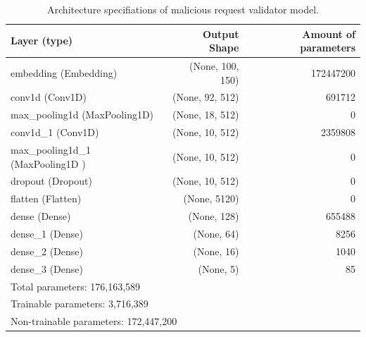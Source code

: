 \begin{table}[ht]
	\begin{tabular}{lrr}
	\hline
	\textbf{Layer (type)}             & \textbf{Output Shape} & \textbf{Amount of parameters} \\ \hline
	embedding (Embedding)             & (None, 100, 150)      & 172447200                     \\
	conv1d (Conv1D)                   & (None, 92, 512)       & 691712                        \\
	max\_pooling1d (MaxPooling1D)     & (None, 18, 512)       & 0                             \\
	conv1d\_1 (Conv1D)                & (None, 10, 512)       & 2359808                       \\
	max\_pooling1d\_1 (MaxPooling1D ) & (None, 10, 512)       & 0                             \\
	dropout (Dropout)                 & (None, 10, 512)       & 0                             \\
	flatten (Flatten)                 & (None, 5120)          & 0                             \\
	dense (Dense)                     & (None, 128)           & 655488                        \\
	dense\_1 (Dense)                  & (None, 64)            & 8256						 \\
	dense\_2 (Dense)                  & (None, 16)            & 1040                         \\ 
	dense\_3 (Dense)                  & (None, 5)             & 85                           
	\\ \hline
	\multicolumn{3}{l}{Total parameters: 176,163,589}                                         \\
	\multicolumn{3}{l}{Trainable parameters: 3,716,389}                                       \\
	\multicolumn{3}{l}{Non-trainable parameters: 172,447,200}                                 \\ \hline
	\end{tabular}
	\caption{\label{demo-table-2} Architecture specifiations of malicious request validator model.}
\end{table}


